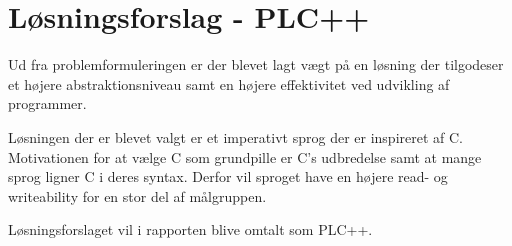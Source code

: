 \section{Løsningsforslag - PLC++}
Ud fra problemformuleringen er der blevet lagt vægt på en løsning der tilgodeser et højere abstraktionsniveau samt en højere effektivitet ved udvikling af programmer.

Løsningen der er blevet valgt er et imperativt sprog der er inspireret af C. Motivationen for at vælge C som grundpille er C's udbredelse samt at mange sprog ligner C i deres syntax. Derfor vil sproget have en højere read- og writeability for en stor del af målgruppen.

Løsningsforslaget vil i rapporten blive omtalt som PLC++.